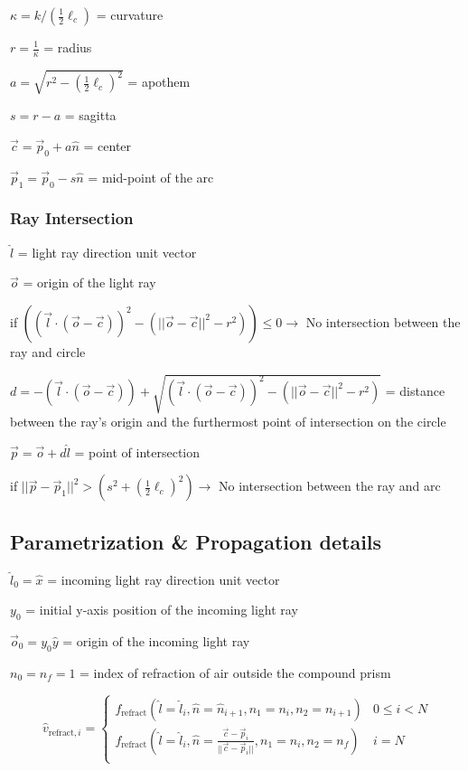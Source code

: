 \documentclass{article}
\begin{document}
$\kappa = k / (\frac{1}{2} \ell_c)$ = curvature

$r = \frac{1}{\kappa}$ = radius

$a = \sqrt{r^2 - (\frac{1}{2}\ell_c)^2}$ = apothem

$s = r - a$ = sagitta

$\vec{c} = \vec{p}_0 + a \hat{n}$ = center

$\vec{p}_1 = \vec{p}_0 - s \hat{n}$ = mid-point of the arc


\subsubsection{Ray Intersection}
$\hat{l}$ = light ray direction unit vector

$\vec{o}$ = origin of the light ray

if $((\vec{l} \cdot (\vec{o} - \vec{c}))^2 - (||\vec{o} - \vec{c}||^2 - r^2)) \leq 0 \to $ No intersection between the ray and circle

$d = -(\vec{l} \cdot (\vec{o} - \vec{c})) + \sqrt{(\vec{l} \cdot (\vec{o} - \vec{c}))^2 - (||\vec{o} - \vec{c}||^2 - r^2)}$
= distance between the ray's origin and the furthermost point of intersection on the circle

$\vec{p} = \vec{o} + d\hat{l}$ = point of intersection

if $||\vec{p} - \vec{p}_1||^2 > (s^2 + (\frac{1}{2}\ell_c)^2) \to $ No intersection between the ray and arc

\subsection{Parametrization \& Propagation details}
$\hat{l}_0 = \hat{x}$ = incoming light ray direction unit vector

$y_0$ = initial y-axis position of the incoming light ray

$\vec{o}_0 = y_0\hat{y}$ = origin of the incoming light ray

$n_0 = n_f = 1$ = index of refraction of air outside the compound prism

\[\hat{v}_{\text{refract}, i} = \begin{cases}
  f_{\text{refract}}(\hat{l}=\hat{l}_i, \hat{n}=\hat{n}_{i+1}, n_1=n_i, n_2=n_{i+1}) & 0 \le i < N \\
  f_{\text{refract}}(\hat{l}=\hat{l}_i, \hat{n}=\frac{\vec{c} - \vec{p}_i}{||\vec{c} - \vec{p}_i||}, n_1=n_i, n_2=n_f) & i = N \\
\end{cases}\]
\end{document}
